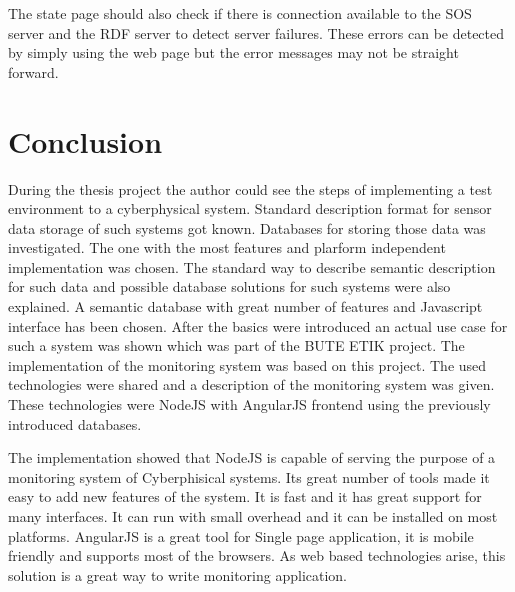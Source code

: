 The state page should also check if there is connection available to the SOS server and the RDF server to detect server failures. These errors can be detected by simply using the web page but the error messages may not be straight forward.

\section{Conclusion}
During the thesis project the author could see the steps of implementing a test environment to a cyberphysical system. Standard description format for sensor data storage of such systems got known. Databases for storing those data was investigated. The one with the most features and plarform independent implementation was chosen. The standard way to describe semantic description for such data and possible database solutions for such systems were also explained. A semantic database with great number of features and Javascript interface has been chosen. After the basics were introduced an actual use case for such a system was shown which was part of the BUTE ETIK project. The implementation of the monitoring system was based on this project. The used technologies were shared and a description of the monitoring system was given. These technologies were NodeJS with AngularJS frontend using the previously introduced databases. 

The implementation showed that NodeJS is capable of serving the purpose of a monitoring system of Cyberphisical systems. Its great number of tools made it easy to add new features of the system. It is fast and it has great support for many interfaces. It can run with small overhead and it can be installed on most platforms. AngularJS is a great tool for Single page application, it is mobile friendly and supports most of the browsers. As web based technologies arise, this solution is a great way to write monitoring application. 

